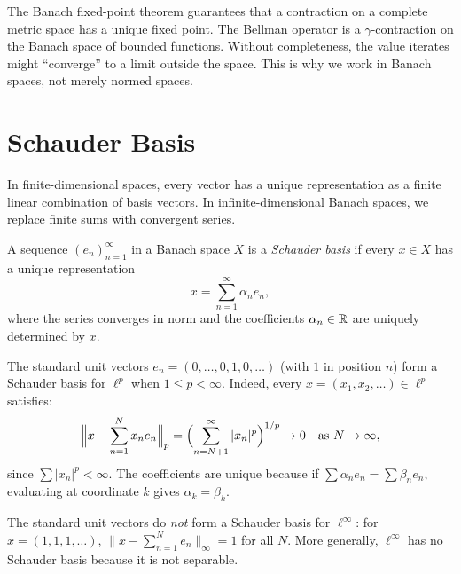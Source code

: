 \documentclass[11pt,a4paper]{article}
\begin{document}
\begin{rlconnection}[title={Why Completeness Matters for RL}]
The Banach fixed-point theorem guarantees that a contraction on a complete
metric space has a unique fixed point. The Bellman operator is a
$\gamma$-contraction on the Banach space of bounded functions. Without
completeness, the value iterates might ``converge'' to a limit outside the
space. This is why we work in Banach spaces, not merely normed spaces.
\end{rlconnection}


\section{Schauder Basis}
\label{sec:schauder}

In finite-dimensional spaces, every vector has a unique representation as a
finite linear combination of basis vectors. In infinite-dimensional Banach
spaces, we replace finite sums with convergent series.

\begin{definition}
\label{def:schauder}
A sequence $(e_n)_{n=1}^\infty$ in a Banach space $X$ is a \emph{Schauder
basis} if every $x \in X$ has a unique representation
\[
x = \sum_{n=1}^\infty \alpha_n e_n,
\]
where the series converges in norm and the coefficients
$\alpha_n \in \mathbb{R}$ are uniquely determined by $x$.
\end{definition}

\begin{example}
\label{ex:schauder_lp}
The standard unit vectors $e_n = (0, \ldots, 0, 1, 0, \ldots)$ (with $1$ in
position $n$) form a Schauder basis for $\ell^p$ when $1 \le p < \infty$.
Indeed, every $x = (x_1, x_2, \ldots) \in \ell^p$ satisfies:
\[
\Bigl\|x - \sum_{n=1}^N x_n e_n\Bigr\|_p
= \Bigl(\sum_{n=N+1}^\infty |x_n|^p\Bigr)^{1/p} \to 0
\quad \text{as } N \to \infty,
\]
since $\sum |x_n|^p < \infty$. The coefficients are unique because if
$\sum \alpha_n e_n = \sum \beta_n e_n$, evaluating at coordinate $k$ gives
$\alpha_k = \beta_k$.
\end{example}

\begin{remark}
The standard unit vectors do \emph{not} form a Schauder basis for
$\ell^\infty$: for $x = (1,1,1,\ldots)$,
$\|x - \sum_{n=1}^N e_n\|_\infty = 1$ for all $N$. More generally,
$\ell^\infty$ has no Schauder basis because it is not separable.
\end{remark}
\end{document}
